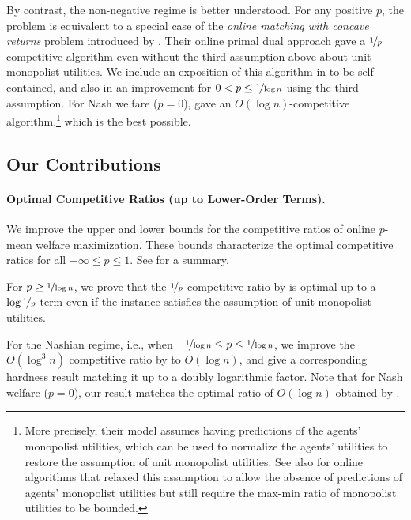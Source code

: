 \documentclass[11pt,letterpaper]{article}
\begin{document}
By contrast, the non-negative regime is better understood.
For any positive $p$, the problem is equivalent to a special case of the \emph{online matching with concave returns} problem introduced by \citet{DevanurJ:STOC:2012}.
Their online primal dual approach gave a $\nicefrac{1}{p}$ competitive algorithm even without the third assumption above about unit monopolist utilities.
We include an exposition of this algorithm in  to be self-contained, and also in  an improvement for $0 < p \le \nicefrac{1}{\log n}$ using the third assumption. 
For Nash welfare ($p = 0$), \citet*{BanerjeeGGJ:SODA:2022} gave an $O(\log n)$-competitive algorithm,\footnote{More precisely, their model assumes having predictions of the agents' monopolist utilities, which can be used to normalize the agents' utilities to restore the assumption of unit monopolist utilities.
	See also \citet*{HuangLSW:WINE:2023} for online algorithms that relaxed this assumption to allow the absence of predictions of agents' monopolist utilities but still require the max-min ratio of monopolist utilities to be bounded.
}
which is the best possible.

\subsection{Our Contributions}

\paragraph{Optimal Competitive Ratios (up to Lower-Order Terms).}
We improve the upper and lower bounds for the competitive ratios of online $p$-mean welfare maximization.
These bounds characterize the optimal competitive ratios for all $-\infty \le p \le 1$.
See  for a summary.

For $p \ge \nicefrac{1}{\log n}$, we prove that the $\nicefrac{1}{p}$ competitive ratio by \citet{DevanurJ:STOC:2012} is optimal up to a $\log \nicefrac{1}{p}$ term even if the instance satisfies the assumption of unit monopolist utilities.

For the Nashian regime, i.e., when $-\nicefrac{1}{\log n} \le p \le \nicefrac{1}{\log n}$, we improve the $O(\log^3 n)$ competitive ratio by \citet{BarmanKM:AAAI:2022} to $O(\log n)$, and give a corresponding hardness result matching it up to a doubly logarithmic factor. 
Note that for Nash welfare ($p = 0$), our result matches the optimal ratio of $O(\log n)$ obtained by \cite{BanerjeeGGJ:SODA:2022}.
\end{document}
